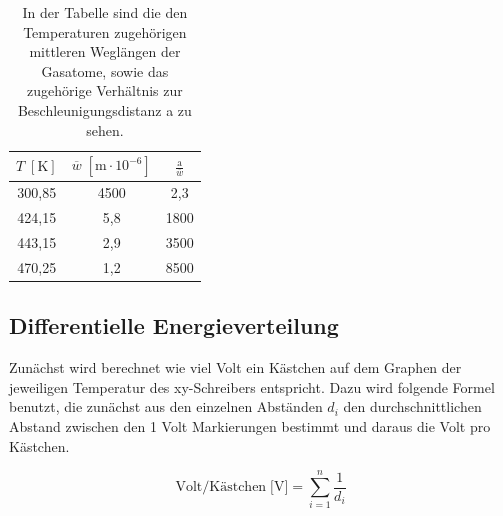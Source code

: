 \documentclass[titlepage = firstcover]{scrartcl}
\begin{document}
            \begin{table}[h]
                \centering
                \caption{In der Tabelle sind die den Temperaturen zugehörigen mittleren Weglängen der Gasatome, sowie das zugehörige Verhältnis zur Beschleunigungsdistanz a zu sehen.}
                \label{tab:TabGasdruck}

                \begin{tabular}{c  c c}
                    \toprule
                    {$T \; [\text{K}] $} & {$\overline{w} \; [\text{m}\cdot 10^{-6}]$} &  {$\frac{\text{a}}{\overline{w}}$} \\
                    \midrule
                    300,85 & 4500 & 2,3 \\
                    424,15 & 5,8 &  1800  \\
                    443,15 & 2,9 &  3500  \\
                    470,25 & 1,2 &  8500  \\
                    \bottomrule
                \end{tabular}

            \end{table}

        \newpage
        \subsection{Differentielle Energieverteilung}
            Zunächst wird berechnet wie viel Volt ein Kästchen auf dem Graphen der jeweiligen Temperatur des xy-Schreibers entspricht. Dazu wird folgende Formel benutzt, die zunächst aus den 
            einzelnen Abständen $d_i$ den durchschnittlichen Abstand zwischen den 1 Volt Markierungen bestimmt und daraus die Volt pro Kästchen.

            \begin{equation*}
                \text{Volt/Kästchen} \; \text{[V]} = \sum_{i=1}^{n} \frac{1}{d_i}
            \end{equation*}

            \FloatBarrier
\end{document}

